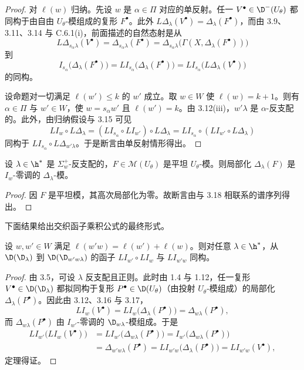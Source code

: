 \begin{proof}
对 $\ell(w)$ 归纳。先设 $w$ 是 $\alpha\in\Pi$ 对应的单反射。任一 $V^\bullet\in\D^-(U_\theta)$ 都同构于由自由 $U_\theta$-模组成的复形 $F^\bullet$。此外 $L\Delta_\lambda(V^\bullet)=\Delta_\lambda(F^\bullet)$，而由 3.9、3.11、3.14 与 C.6.1(i)，前面描述的自然态射是从
$$L\Delta_{s_\alpha\lambda}(V^\bullet)=\Delta_{s_\alpha\lambda}(F^\bullet)=\Delta_{s_\alpha\lambda}\bigl(\Gamma(X,\Delta_\lambda(F^\bullet))\bigr)$$
到
$$I_{s_\alpha}\bigl(\Delta_\lambda(F^\bullet)\bigr)=LI_{s_\alpha}\bigl(\Delta_\lambda(F^\bullet)\bigr)=LI_{s_\alpha}\bigl(L\Delta_\lambda(V^\bullet)\bigr)$$
的同构。

设命题对一切满足 $\ell(w')\le k$ 的 $w'$ 成立。取 $w\in W$ 使 $\ell(w)=k+1$。则有 $\alpha\in\Pi$ 与 $w'\in W$，使 $w=s_\alpha w'$ 且 $\ell(w')=k$。由 3.12(iii)，$w'\lambda$ 是 $\alpha$-反支配的。此外，由归纳假设与 3.15 可见
$$LI_w\circ L\Delta_\lambda=(LI_{s_\alpha}\circ LI_{w'})\circ L\Delta_\lambda=LI_{s_\alpha}\circ(LI_{w'}\circ L\Delta_\lambda)$$
同构于 $LI_{s_\alpha}\circ L\Delta_{w'\lambda}$。于是断言由单反射情形得出。
\end{proof}

\begin{corollary}\label{cor:03.3.17}
设 $\lambda\in\h^*$ 是 $\Sigma^+_w$-反支配的，$F\in\mathcal{M}(U_\theta)$ 是平坦 $U_\theta$-模。则局部化 $\Delta_\lambda(F)$ 是 $I_w$-零调的 $\Delta_\lambda$-模。
\end{corollary}

\begin{proof}
因 $F$ 是平坦模，其高次局部化为零。故断言由与 3.18 相联系的谱序列得出。
\end{proof}

下面结果给出交织函子乘积公式的最终形式。

\begin{theorem}\label{thm:03.3.18}
设 $w,w'\in W$ 满足 $\ell(w'w)=\ell(w')+\ell(w)$。则对任意 $\lambda\in\h^*$，从 $\D(\D_\lambda)$ 到 $\D(\D_{w'w\lambda})$ 的函子 $LI_{w'}\circ LI_w$ 与 $LI_{w'w}$ 同构。
\end{theorem}

\begin{proof}
由 3.5，可设 $\lambda$ 反支配且正则。此时由 1.4 与 1.12，任一复形 $V^\bullet\in\D(\D_\lambda)$ 都拟同构于复形 $P^\bullet\in\D(U_\theta)$（由投射 $U_\theta$-模组成）的局部化 $\Delta_\lambda(P^\bullet)$。因此由 3.12、3.16 与 3.17，
$$LI_w(V^\bullet)=LI_w\bigl(\Delta_\lambda(P^\bullet)\bigr)=\Delta_{w\lambda}(P^\bullet),$$
而 $\Delta_{w\lambda}(P^\bullet)$ 由 $I_{w'}$-零调的 $\D_{w\lambda}$-模组成。于是
\begin{align*}
LI_{w'}\bigl(LI_w(V^\bullet)\bigr)&=LI_{w'}\bigl(\Delta_{w\lambda}(P^\bullet)\bigr)=I_{w'}\bigl(\Delta_{w\lambda}(P^\bullet)\bigr)\\
&=\Delta_{w'w\lambda}(P^\bullet)=LI_{w'w}\bigl(\Delta_\lambda(P^\bullet)\bigr)=LI_{w'w}(V^\bullet),
\end{align*}
定理得证。
\end{proof}

